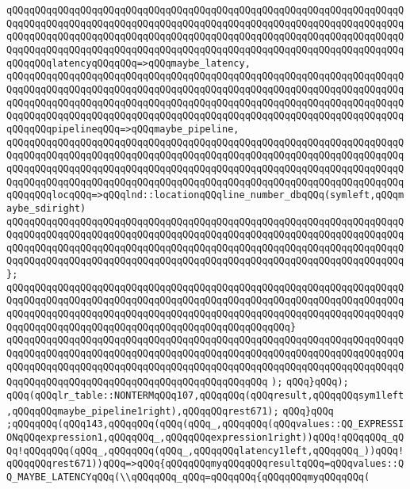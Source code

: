 \verb|qQQqqQQqqQQqqQQqqQQqqQQqqQQqqQQqqQQqqQQqqQQqqQQqqQQqqQQqqQQqqQQqqQQqqQQqqQQqqQQqqQQqqQQqqQQqqQQqqQQqqQQqqQQqqQQqqQQqqQQqqQQqqQQqqQQqqQQqqQQqqQQqqQQqqQQqqQQqqQQqqQQqqQQqqQQqqQQqqQQqqQQqqQQqqQQqqQQqqQQqqQQqqQQqqQQqqQQqqQQqqQQqqQQqqQQqqQQqqQQqqQQqqQQqqQQqqQQqqQQqqQQqqQQqqQQqqQQqqQQqqQQqqQQqlatencyqQQqqQQq=>qQQqmaybe_latency,|\newline
\verb|qQQqqQQqqQQqqQQqqQQqqQQqqQQqqQQqqQQqqQQqqQQqqQQqqQQqqQQqqQQqqQQqqQQqqQQqqQQqqQQqqQQqqQQqqQQqqQQqqQQqqQQqqQQqqQQqqQQqqQQqqQQqqQQqqQQqqQQqqQQqqQQqqQQqqQQqqQQqqQQqqQQqqQQqqQQqqQQqqQQqqQQqqQQqqQQqqQQqqQQqqQQqqQQqqQQqqQQqqQQqqQQqqQQqqQQqqQQqqQQqqQQqqQQqqQQqqQQqqQQqqQQqqQQqqQQqqQQqqQQqqQQqqQQqpipelineqQQq=>qQQqmaybe_pipeline,|\newline
\verb|qQQqqQQqqQQqqQQqqQQqqQQqqQQqqQQqqQQqqQQqqQQqqQQqqQQqqQQqqQQqqQQqqQQqqQQqqQQqqQQqqQQqqQQqqQQqqQQqqQQqqQQqqQQqqQQqqQQqqQQqqQQqqQQqqQQqqQQqqQQqqQQqqQQqqQQqqQQqqQQqqQQqqQQqqQQqqQQqqQQqqQQqqQQqqQQqqQQqqQQqqQQqqQQqqQQqqQQqqQQqqQQqqQQqqQQqqQQqqQQqqQQqqQQqqQQqqQQqqQQqqQQqqQQqqQQqqQQqqQQqqQQqqQQqlocqQQq=>qQQqlnd::locationqQQqline_number_dbqQQq(symleft,qQQqmaybe_sdiright)|\newline
\verb|qQQqqQQqqQQqqQQqqQQqqQQqqQQqqQQqqQQqqQQqqQQqqQQqqQQqqQQqqQQqqQQqqQQqqQQqqQQqqQQqqQQqqQQqqQQqqQQqqQQqqQQqqQQqqQQqqQQqqQQqqQQqqQQqqQQqqQQqqQQqqQQqqQQqqQQqqQQqqQQqqQQqqQQqqQQqqQQqqQQqqQQqqQQqqQQqqQQqqQQqqQQqqQQqqQQqqQQqqQQqqQQqqQQqqQQqqQQqqQQqqQQqqQQqqQQqqQQqqQQqqQQqqQQqqQQqqQQqqQQq};|\newline
\verb|qQQqqQQqqQQqqQQqqQQqqQQqqQQqqQQqqQQqqQQqqQQqqQQqqQQqqQQqqQQqqQQqqQQqqQQqqQQqqQQqqQQqqQQqqQQqqQQqqQQqqQQqqQQqqQQqqQQqqQQqqQQqqQQqqQQqqQQqqQQqqQQqqQQqqQQqqQQqqQQqqQQqqQQqqQQqqQQqqQQqqQQqqQQqqQQqqQQqqQQqqQQqqQQqqQQqqQQqqQQqqQQqqQQqqQQqqQQqqQQqqQQqqQQqqQQqqQQqqQQq}|\newline
\verb|qQQqqQQqqQQqqQQqqQQqqQQqqQQqqQQqqQQqqQQqqQQqqQQqqQQqqQQqqQQqqQQqqQQqqQQqqQQqqQQqqQQqqQQqqQQqqQQqqQQqqQQqqQQqqQQqqQQqqQQqqQQqqQQqqQQqqQQqqQQqqQQqqQQqqQQqqQQqqQQqqQQqqQQqqQQqqQQqqQQqqQQqqQQqqQQqqQQqqQQqqQQqqQQqqQQqqQQqqQQqqQQqqQQqqQQqqQQqqQQqqQQqqQQqqQQqqQQq|\newline
\verb|);|\newline
\verb|qQQq}qQQq);|\newline
\verb|qQQq(qQQqlr_table::NONTERMqQQq107,qQQqqQQq(qQQqresult,qQQqqQQqsym1left,qQQqqQQqmaybe_pipeline1right),qQQqqQQqrest671);|\newline
\verb|qQQq}qQQq|\newline
\verb|;qQQqqQQq(qQQq143,qQQqqQQq(qQQq(qQQq_,qQQqqQQq(qQQqvalues::QQ_EXPRESSIONqQQqexpression1,qQQqqQQq_,qQQqqQQqexpression1right))qQQq!qQQqqQQq_qQQq!qQQqqQQq(qQQq_,qQQqqQQq(qQQq_,qQQqqQQqlatency1left,qQQqqQQq_))qQQq!qQQqqQQqrest671))qQQq=>qQQq{qQQqqQQqmyqQQqqQQqresultqQQq=qQQqvalues::QQ_MAYBE_LATENCYqQQq(\\qQQqqQQq_qQQq=qQQqqQQq{qQQqqQQqmyqQQqqQQq(|\newline
